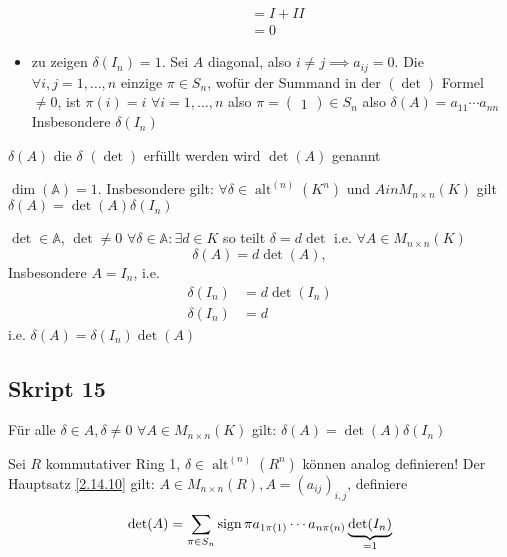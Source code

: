 \begin{subproof*}
\begin{itemize}
\begin{align*}
					  &= I + II \\
					  &= 0
			\end{align*}
		\item zu zeigen $ \delta(I_n) = 1 $.
			Sei $ A $ diagonal, also $ i \neq j \implies a_{ij} = 0 $.
			Die $ \forall i, j = 1, \dotsc, n $ einzige $ \pi \in S_n $,
			wofür der Summand in der $ (\det) $ Formel $ \neq  0 $, ist $ \pi (i) = i $ $ \forall i = 1, \dotsc, n $ also $ \pi = \begin{pmatrix} 1 \end{pmatrix}  \in S_n $ 
			also $ \delta(A) = a_{11} \dotsb a_{nn}  $ 
			Insbesondere $ \delta(I_n) $
	\end{itemize}
\end{subproof*}

\begin{subdefinition*}[Bezeichung]
	$ \delta(A) $ die $ \delta $ $ (\det) $ erfüllt werden wird $ \det(A) $ genannt
\end{subdefinition*}

\begin{subcorollary}
	$ \dim (\mathbb{A}) = 1 $.
	Insbesondere gilt: $ \forall \delta \in \operatorname{alt}^{(n)} (K^n) $ und $ A in M_{n \times n} (K) $ gilt $ \delta(A) = \det(A) \delta(I_n) $
\end{subcorollary}
\begin{subproof*}
	$ \det \in \mathbb{A} $, $ \det \neq 0 $ $ \forall \delta \in \mathbb{A} : \exists d \in K $ so teilt $ \delta = d \det $ 
	i.e. $ \forall A \in M_{n \times n} (K) $
	\[
		\delta(A) = d \det(A),
	\]
	Insbesondere $ A = I_n $, i.e.
	\begin{align*}
		\delta(I_n) &= d \det (I_n)\\
		\delta(I_n) &= d 
	\end{align*}
	i.e. $ \delta(A) = \delta(I_n) \det (A) $
\end{subproof*}

\subsection{Skript 15}
\begin{subcorollary}
	Für alle $ \delta \in A, \delta \neq 0 $ $ \forall A \in M_{n \times n} (K) $ gilt: $ \delta(A) = \det(A) \delta(I_n) $
\end{subcorollary}

\begin{subnote}
	Sei $ R $ kommutativer Ring 1, $ \delta \in \operatorname{alt}^{(n)} \left( R^n \right)  $ können analog definieren!
	Der Hauptsatz \ref{2.14.10} gilt:
	$ A \in M_{n \times  n} \left( R \right) , A = \left( a_{ij}  \right) _{i, j}  $, definiere
	\[
		\det(A) = \sum_{\pi \in S_n}^{} \operatorname{sign} \pi  a_{1 \pi (1)} \dotsb a_{n \pi (n)} \underbrace{\det(I_n)}_{=1}
	\]
\end{subnote}

